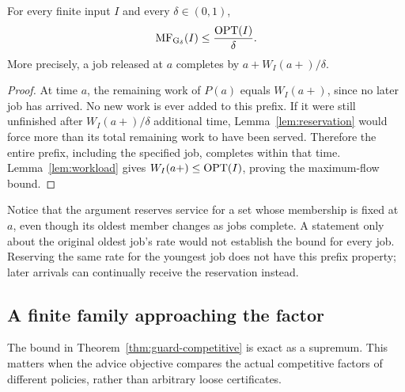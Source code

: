 \begin{theorem}\label{thm:guard-competitive}
For every finite input $I$ and every $\delta\in(0,1)$,
\begin{equation}\label{eq:guard-competitive}
 \operatorname{MF}_{\operatorname{G}_\delta}(I)\leq\frac{\operatorname{OPT}(I)}{\delta}.
\end{equation}
More precisely, a job released at $a$ completes by $a+W_I(a+)/\delta$.
\end{theorem}
\begin{proof}
At time $a$, the remaining work of $P(a)$ equals $W_I(a+)$, since no later job has arrived. No new work is ever added to this prefix. If it were still unfinished after $W_I(a+)/\delta$ additional time, Lemma~\ref{lem:reservation} would force more than its total remaining work to have been served. Therefore the entire prefix, including the specified job, completes within that time. Lemma~\ref{lem:workload} gives $W_I(a+)\leq\operatorname{OPT}(I)$, proving the maximum-flow bound.
\end{proof}

Notice that the argument reserves service for a set whose membership is fixed at $a$, even though its oldest member changes as jobs complete. A statement only about the original oldest job's rate would not establish the bound for every job. Reserving the same rate for the youngest job does not have this prefix property; later arrivals can continually receive the reservation instead.

\subsection{A finite family approaching the factor}
The bound in Theorem~\ref{thm:guard-competitive} is exact as a supremum. This matters when the advice objective compares the actual competitive factors of different policies, rather than arbitrary loose certificates.

